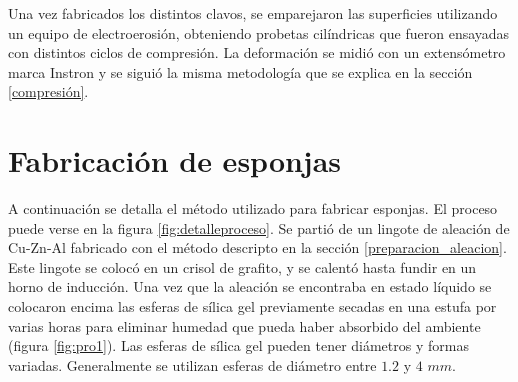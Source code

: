 \documentclass[a4paper,12pt,fleqn,twoside,openany]{book}
\begin{document}
    
    Una vez fabricados los distintos clavos, se emparejaron las superficies utilizando un equipo de electroerosión, obteniendo probetas cilíndricas que fueron ensayadas con distintos ciclos de compresión. La deformación se midió con un extensómetro marca Instron y se siguió la misma metodología que se explica en la sección \ref{compresión}.
    

\section{Fabricación de esponjas} \label{FabricacionEsponjas}

A continuación se detalla el método utilizado para fabricar esponjas. El proceso puede verse en la figura \ref{fig:detalleproceso}. Se partió de un lingote de aleación de Cu-Zn-Al fabricado con el método descripto en la sección \ref{preparacion_aleacion}. Este lingote se colocó en un crisol de grafito, y se calentó hasta fundir en un horno de inducción. Una vez que la aleación se encontraba en estado líquido se colocaron encima las esferas de sílica gel previamente secadas en una estufa por varias horas para eliminar humedad que pueda haber absorbido del ambiente (figura \ref{fig:pro1}). Las esferas de sílica gel pueden tener diámetros y formas variadas. Generalmente se utilizan esferas de diámetro entre $1.2$ y $4$ $mm$.
\end{document}
